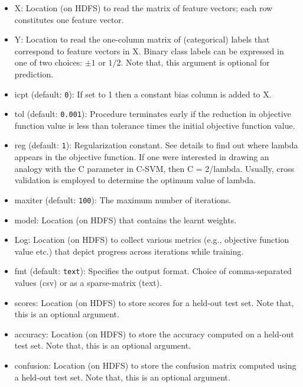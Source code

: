 

\begin{itemize}
\item X: Location (on HDFS) to read the matrix of feature vectors; 
each row constitutes one feature vector.
\item Y: Location to read the one-column matrix of (categorical) 
labels that correspond to feature vectors in X. Binary class labels 
can be expressed in one of two choices: $\pm 1$ or $1/2$. Note that,
this argument is optional for prediction.
\item icpt (default: {\tt 0}): If set to 1 then a constant bias column is 
added to X. 
\item tol (default: {\tt 0.001}): Procedure terminates early if the reduction
in objective function value is less than tolerance times the initial objective
function value.
\item reg (default: {\tt 1}): Regularization constant. See details to find 
out where lambda appears in the objective function. If one were interested 
in drawing an analogy with the C parameter in C-SVM, then C = 2/lambda. 
Usually, cross validation is employed to determine the optimum value of 
lambda.
\item maxiter (default: {\tt 100}): The maximum number of iterations.
\item model: Location (on HDFS) that contains the learnt weights.
\item Log: Location (on HDFS) to collect various metrics (e.g., objective 
function value etc.) that depict progress across iterations while training.
\item fmt (default: {\tt text}): Specifies the output format. Choice of 
comma-separated values (csv) or as a sparse-matrix (text).
\item scores: Location (on HDFS) to store scores for a held-out test set.
Note that, this is an optional argument.
\item accuracy: Location (on HDFS) to store the accuracy computed on a
held-out test set. Note that, this is an optional argument.
\item confusion: Location (on HDFS) to store the confusion matrix
computed using a held-out test set. Note that, this is an optional 
argument.
\end{itemize}

